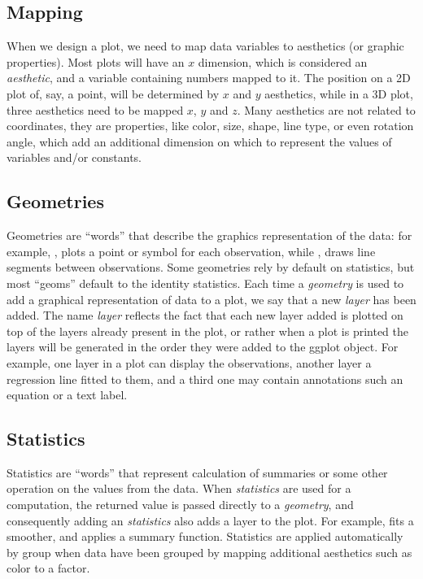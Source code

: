 \documentclass[krantz2]{krantz}\usepackage{knitr}
\begin{document}
\subsection{Mapping}

When we design a plot, we need to map data variables to aesthetics (or graphic properties). Most plots will have an $x$ dimension, which is considered an \emph{aesthetic}, and a variable containing numbers mapped to it. The position on a 2D plot of, say, a point, will be determined by $x$ and $y$ aesthetics, while in a 3D plot, three aesthetics need to be mapped $x$, $y$ and $z$. Many aesthetics are not related to coordinates, they are properties, like color, size, shape, line type, or even rotation angle, which add an additional dimension on which to represent the values of variables and/or constants.

\subsection{Geometries}

\sloppy%
Geometries are ``words'' that describe the graphics representation of the data: for example, , plots a point or symbol for each observation, while , draws line segments between observations. Some geometries rely by default on statistics, but most ``geoms'' default to the identity statistics. Each time a \emph{geometry} is used to add a graphical representation of data to a plot, we say that a new \emph{layer} has been added. The name \emph{layer} reflects the fact that each new layer added is plotted on top of the layers already present in the plot, or rather when a plot is printed the layers will be generated in the order they were added to the ggplot object. For example, one layer in a plot can display the observations, another layer a regression line fitted to them, and a third one may contain annotations such an equation or a text label.

\subsection{Statistics}

Statistics are ``words'' that represent calculation of summaries or some other operation on the values from the data. When \emph{statistics} are used for a computation, the returned value is passed directly to a \emph{geometry}, and consequently adding an \emph{statistics} also adds a layer to the plot. For example,  fits a smoother, and  applies a summary function. Statistics are applied automatically by group when data have been grouped by mapping additional aesthetics such as color to a factor.
\end{document}
